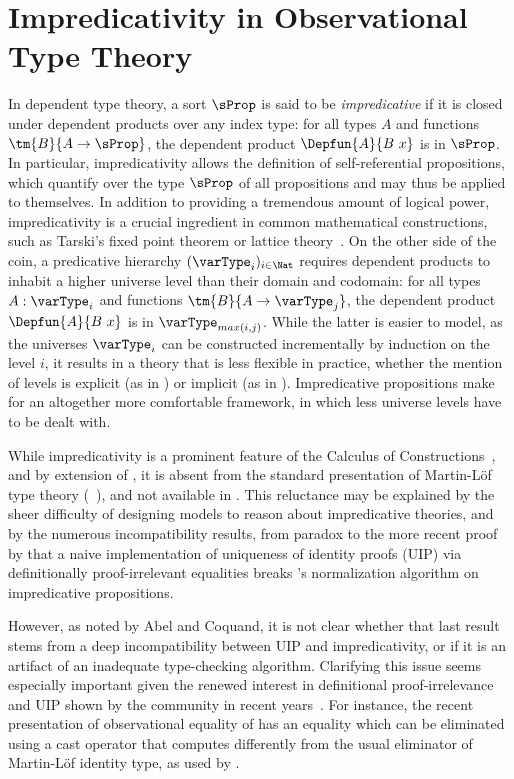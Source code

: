 \setchapterpreamble[u]{\margintoc}
\chapter{Impredicativity in Observational Type Theory}

In dependent type theory, a sort \( \sProp \) is said to be
\emph{impredicative} if it is closed under dependent products over any index
type: for all types \( A \) and functions \( \tm{B}{A \to \sProp} \),
the dependent product \( \Depfun{A}{B\ x} \) is in \( \sProp \).
%
In particular, impredicativity allows the definition of self-referential propositions,
which quantify over the type \( \sProp \) of all propositions and may thus
be applied to themselves.
%
In addition to providing a tremendous amount of logical power, impredicativity is
a crucial ingredient in common mathematical constructions, such as
Tarski's fixed point theorem or lattice theory~.
%
On the other side of the coin, a predicative hierarchy $(\varType_i)_{i \in \Nat}$
requires dependent products to inhabit a higher universe level
than their domain and codomain: for all types \( A : \varType_i \) and functions
\( \tm{B}{A \to \varType_j} \), the dependent product
\( \Depfun{A}{B\ x} \) is in \( \varType_{max(i,j)} \).
%
While the latter is easier to model, as the universes $\varType_i$ can be
constructed incrementally by induction on the level $i$, it results
in a theory that is less flexible in practice, whether the mention of
levels is explicit (as in \Agda) or implicit (as in \Coq).
%
Impredicative propositions make for an altogether
more comfortable framework, in which less universe levels have to
be dealt with.

While impredicativity is a prominent feature of the Calculus of
Constructions~, and by extension of \Coq, it is
absent from the standard presentation of Martin-Löf type theory
(\MLTT~), and not available in \Agda.
%
This reluctance may be explained by the sheer difficulty of designing models
to reason about impredicative theories, and by the numerous incompatibility
results, from  paradox to the more recent proof by
 that a naive implementation of uniqueness of identity
proofs (UIP) via definitionally proof-irrelevant equalities breaks \Coq's
normalization algorithm on impredicative propositions.

However, as noted by Abel and Coquand, it is not clear whether that last
result stems from a deep incompatibility between UIP and impredicativity,
or if it is an artifact of an inadequate type-checking algorithm.
%
Clarifying this issue seems especially important given the renewed
interest in definitional proof-irrelevance and UIP shown by the community
in recent years~.
%
For instance, the recent presentation \SetoidTT of observational
equality of  has an equality which can be
eliminated using a cast operator that computes differently from the
usual eliminator of Martin-Löf identity type, as used by .


